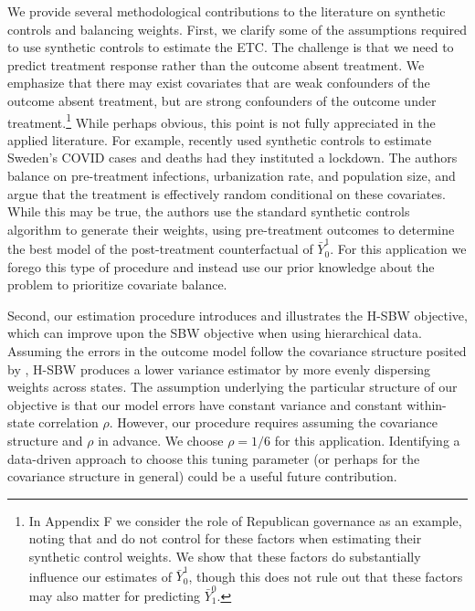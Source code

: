 \documentclass[aoas]{imsart}
\theoremstyle{plain}
\theoremstyle{remark}
\begin{document}
We provide several methodological contributions to the literature on synthetic controls and balancing weights. First, we clarify some of the assumptions required to use synthetic controls to estimate the ETC. The challenge is that we need to predict treatment response rather than the outcome absent treatment. We emphasize that there may exist covariates that are weak confounders of the outcome absent treatment, but are strong confounders of the outcome under treatment.\footnote{In Appendix F we consider the role of Republican governance as an example, noting that \cite{kaestner2017effects} and \cite{courtemanche2017early} do not control for these factors when estimating their synthetic control weights. We show that these factors do substantially influence our estimates of $\bar{Y}_0^1$, though this does not rule out that these factors may also matter for predicting $\bar{Y}_1^0$.} While perhaps obvious, this point is not fully appreciated in the applied literature. For example, \cite{born2020lockdowns} recently used synthetic controls to estimate Sweden's COVID cases and deaths had they instituted a lockdown. The authors balance on pre-treatment infections, urbanization rate, and population size, and argue that the treatment is effectively random conditional on these covariates. While this may be true, the authors use the standard synthetic controls algorithm to generate their weights, using pre-treatment outcomes to determine the best model of the post-treatment counterfactual of $\bar{Y}^1_0$. For this application we forego this type of procedure and instead use our prior knowledge about the problem to prioritize covariate balance.

Second, our estimation procedure introduces and illustrates the H-SBW objective, which can improve upon the SBW objective when using hierarchical data. Assuming the errors in the outcome model follow the covariance structure posited by \cite{kloek1981ols}, H-SBW produces a lower variance estimator by more evenly dispersing weights across states. The assumption underlying the particular structure of our objective is that our model errors have constant variance and constant within-state correlation $\rho$. However, our procedure requires assuming the covariance structure and $\rho$ in advance. We choose $\rho = 1/6$ for this application. Identifying a data-driven approach to choose this tuning parameter (or perhaps for the covariance structure in general) could be a useful future contribution. 
\end{document}

